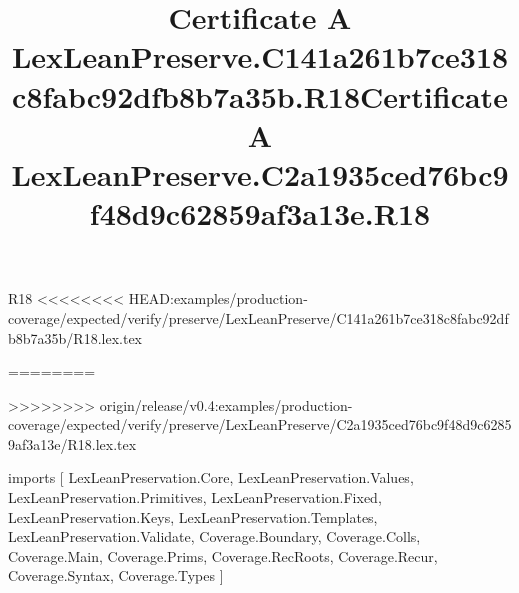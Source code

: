 \begin{lexlean}{R18}
<<<<<<<< HEAD:examples/production-coverage/expected/verify/preserve/LexLeanPreserve/C141a261b7ce318c8fabc92dfb8b7a35b/R18.lex.tex
\title{Certificate A LexLeanPreserve.C141a261b7ce318c8fabc92dfb8b7a35b.R18}
========
\title{Certificate A LexLeanPreserve.C2a1935ced76bc9f48d9c62859af3a13e.R18}
>>>>>>>> origin/release/v0.4:examples/production-coverage/expected/verify/preserve/LexLeanPreserve/C2a1935ced76bc9f48d9c62859af3a13e/R18.lex.tex
\begin{coremodule}
imports [
  LexLeanPreservation.Core,
  LexLeanPreservation.Values,
  LexLeanPreservation.Primitives,
  LexLeanPreservation.Fixed,
  LexLeanPreservation.Keys,
  LexLeanPreservation.Templates,
  LexLeanPreservation.Validate,
  Coverage.Boundary,
  Coverage.Colls,
  Coverage.Main,
  Coverage.Prims,
  Coverage.RecRoots,
  Coverage.Recur,
  Coverage.Syntax,
  Coverage.Types
]


\end{coremodule}
\end{lexlean}
